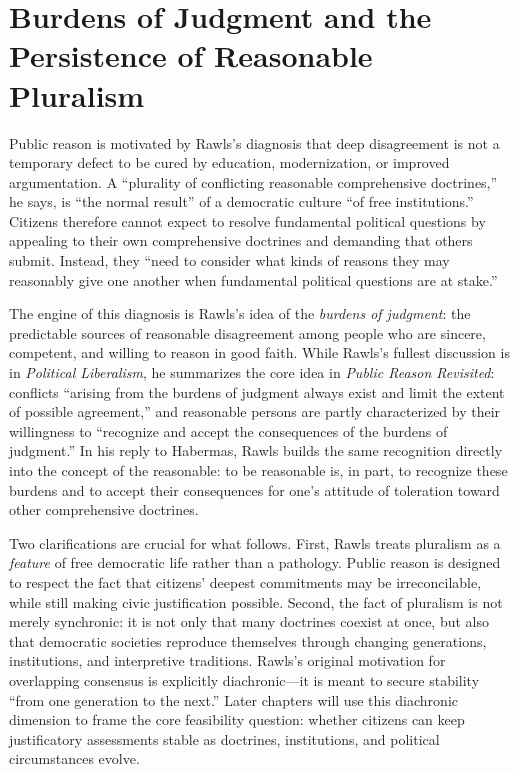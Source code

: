 \documentclass[12pt]{report}
\begin{document}
\section{Burdens of Judgment and the Persistence of Reasonable Pluralism}

Public reason is motivated by Rawls’s diagnosis that deep disagreement is not a temporary defect to be cured by education, modernization, or improved argumentation. A “plurality of conflicting reasonable comprehensive doctrines,” he says, is “the normal result” of a democratic culture “of free institutions.”\parencite[p.~766]{rawls1997public} Citizens therefore cannot expect to resolve fundamental political questions by appealing to their own comprehensive doctrines and demanding that others submit. Instead, they “need to consider what kinds of reasons they may reasonably give one another when fundamental political questions are at stake.”\parencite[p.~766]{rawls1997public}

The engine of this diagnosis is Rawls’s idea of the \emph{burdens of judgment}: the predictable sources of reasonable disagreement among people who are sincere, competent, and willing to reason in good faith. While Rawls’s fullest discussion is in \emph{Political Liberalism}, he summarizes the core idea in \emph{Public Reason Revisited}: conflicts “arising from the burdens of judgment always exist and limit the extent of possible agreement,” and reasonable persons are partly characterized by their willingness to “recognize and accept the consequences of the burdens of judgment.”\parencite[p.~805]{rawls1997public} In his reply to Habermas, Rawls builds the same recognition directly into the concept of the reasonable: to be reasonable is, in part, to recognize these burdens and to accept their consequences for one’s attitude of toleration toward other comprehensive doctrines.\parencite[p.~134]{rawls1995reply}

Two clarifications are crucial for what follows. First, Rawls treats pluralism as a \emph{feature} of free democratic life rather than a pathology. Public reason is designed to respect the fact that citizens’ deepest commitments may be irreconcilable, while still making civic justification possible.\parencite[p.~766]{rawls1997public} Second, the fact of pluralism is not merely synchronic: it is not only that many doctrines coexist at once, but also that democratic societies reproduce themselves through changing generations, institutions, and interpretive traditions. Rawls’s original motivation for overlapping consensus is explicitly diachronic---it is meant to secure stability “from one generation to the next.”\parencite[p.~1]{rawls1987overlapping} Later chapters will use this diachronic dimension to frame the core feasibility question: whether citizens can keep justificatory assessments stable as doctrines, institutions, and political circumstances evolve.
\end{document}
